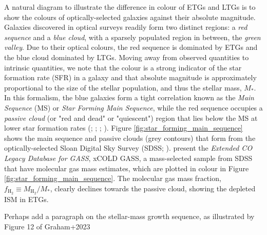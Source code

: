 A natural diagram to illustrate the difference in colour of ETGs and LTGs is to show the colours of optically-selected galaxies against their absolute magnitude. Galaxies discovered in optical surveys readily form two distinct regions: a \textit{red sequence} and a \textit{blue cloud}, with a sparsely populated region in between, the \textit{green valley}. Due to their optical colours, the red sequence is dominated by ETGs and the blue cloud dominated by LTGs. Moving away from observed quantities to intrinsic quantities, we note that the colour is a strong indicator of the star formation rate (SFR) in a galaxy and that absolute magnitude is approximately proportional to the size of the stellar population, and thus the stellar mass, $M_*$. In this formalism, the blue galaxies form a tight correlation known as the \textit{Main Sequence} (MS) or \textit{Star Forming Main Sequence}, while the red sequence occupies a \textit{passive cloud} (or "red and dead" or "quiescent") region that lies below the MS at lower star formation rates (\citealt{Noeske_2007}; \citealt{Daddi_2007}; \citealt{Elbaz_2007}; \citealt{Rodighiero_2011}). Figure \ref{fig:star_forming_main_sequence} shows the main sequence and passive clouds (grey contours) that form from the optically-selected Sloan Digital Sky Survey (SDSS; \citealt{York_2000}). \citealt{Saintonge_2017} present the \textit{Extended CO Legacy Database for GASS}, xCOLD GASS, a mass-selected sample from SDSS that have molecular gas mass estimates, which are plotted in colour in Figure \ref{fig:star_forming_main_sequence}. The molecular gas mass fraction, $f_{\textrm{H}_2} \equiv M_{\textrm{H}_2}/M_*$, clearly declines towards the passive cloud, showing the depleted ISM in ETGs.

{\color{red}Perhaps add a paragraph on the stellar-mass growth sequence, as illustrated by Figure 12 of Graham+2023}

